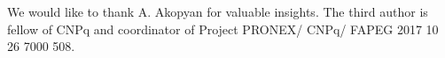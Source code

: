 \noindent We would like to thank A. Akopyan for valuable insights. The third author is fellow of CNPq and coordinator of Project PRONEX/ CNPq/ FAPEG 2017 10 26 7000 508.